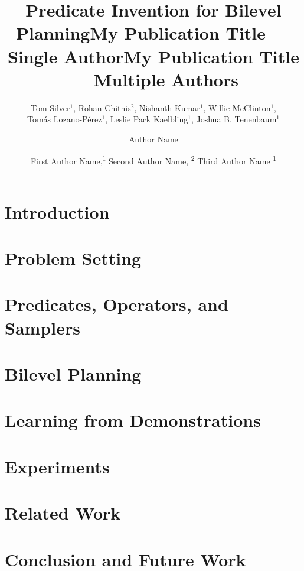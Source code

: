 \documentclass[letterpaper]{article} %
\title{Predicate Invention for Bilevel Planning}
\author{
    Tom Silver\equalcontrib$^1$,
    Rohan Chitnis\equalcontrib$^2$,
    Nishanth Kumar$^1$,
    Willie McClinton$^1$,\\
    Tom\'as Lozano-P\'erez$^1$,
    Leslie Pack Kaelbling$^1$,
    Joshua B. Tenenbaum$^1$
}
\title{My Publication Title --- Single Author}
\author {
    Author Name
}
\title{My Publication Title --- Multiple Authors}
\author {
    First Author Name,\textsuperscript{\rm 1}
    Second Author Name, \textsuperscript{\rm 2}
    Third Author Name \textsuperscript{\rm 1}
}
\begin{document}
\maketitle



\section{Introduction}
\label{sec:intro}



\section{Problem Setting}
\label{sec:problem}



\section{Predicates, Operators, and Samplers}
\label{sec:representation}



\section{Bilevel Planning}
\label{sec:planning}



\section{Learning from Demonstrations}
\label{sec:learning}



\section{Experiments}
\label{sec:experiments}



\section{Related Work}
\label{sec:rw}



\section{Conclusion and Future Work}
\label{sec:conclusion}
\end{document}
